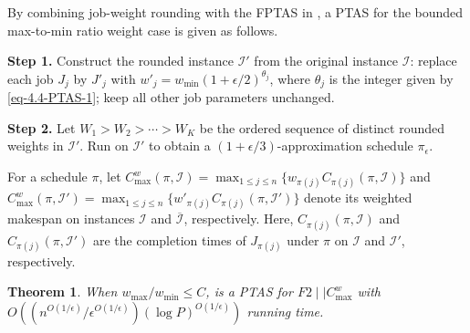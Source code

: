 ﻿\documentclass[12pt]{article} \textheight=24.5cm \textwidth=16.5cm \parskip = 0.165cm
\newtheorem{theorem}{Theorem}[section]
\begin{document}
\begin{sloppypar}
        By combining job-weight rounding with the FPTAS in , a PTAS for the bounded max-to-min ratio weight case is given as follows.

        \begin{algorithm}[H]
            \small
            \linespread{1.2}\selectfont
            \SetAlgoLined
            \DontPrintSemicolon
            \caption{A PTAS for $F2 \mid \mid C_{\max}^w$ with bounded max-to-min weight ratio}  \label{Alg-PTAS}
            \BlankLine
            \textbf{Step 1.} Construct the rounded instance $\mathcal{I}'$ from the original instance $\mathcal{I}$: replace each job $J_j$ by $J'_j$ with $w'_j=w_{\min}(1+\epsilon/2)^{\theta_j}$, where $\theta_j$ is the integer given by \cref{eq-4.4-PTAS-1}; keep all other job parameters unchanged. \;

            \textbf{Step 2.} Let $W_1 >W_2> \cdots >W_K$ be the ordered sequence of distinct rounded weights in $\mathcal{I}'$. Run  on $\mathcal{I}'$ to obtain a $(1+\epsilon/3)$-approximation schedule $\pi_{\epsilon}$. \;

        \end{algorithm}

        For a schedule $\pi$, let $C_{\max}^w(\pi, \mathcal{I})=\max_{1 \leq j \leq n}\{ w_{\pi(j)} C_{\pi(j)}(\pi,\mathcal{I})\}$ and $C_{\max}^w(\pi,\mathcal{I}')=\max_{1 \leq j \leq n}\{ w'_{\pi(j)} C_{\pi(j)}(\pi, \mathcal{I}')\}$ denote its weighted makespan on instances $\mathcal{I}$ and $\overline{\mathcal{I}}$, respectively.
        Here, $C_{\pi(j)}(\pi,\mathcal{I})$ and $C_{\pi(j)}(\pi, \mathcal{I}')$ are the completion times of $J_{\pi(j)}$ under $\pi$ on $\mathcal{I}$ and $\mathcal{I}'$, respectively.

        \begin{theorem} \label{Theorem-PTAS}
        When $w_{\max}/w_{\min} \leq C$,  is a PTAS for $F2 \mid \mid C_{\max}^w$ with $O((n^{O(1/\epsilon)}/\epsilon^{O(1/\epsilon)}) (\log P)^{O(1/\epsilon)})$ running time.
        \end{theorem}


\end{sloppypar}
\end{document}

